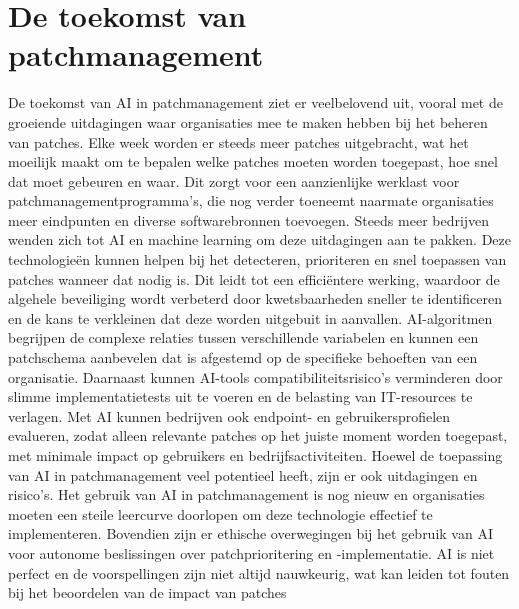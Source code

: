 \section{De toekomst van patchmanagement}
De toekomst van AI in patchmanagement ziet er veelbelovend uit, vooral met de groeiende uitdagingen waar organisaties mee te maken hebben bij
het beheren van patches. Elke week worden er steeds meer patches uitgebracht, wat het moeilijk maakt om te bepalen welke patches moeten worden toegepast, hoe snel dat moet gebeuren en waar. Dit zorgt voor een aanzienlijke werklast voor patchmanagementprogramma's, die nog verder toeneemt naarmate
organisaties meer eindpunten en diverse softwarebronnen toevoegen. Steeds meer bedrijven wenden zich tot AI en machine learning
om deze uitdagingen aan te pakken. Deze technologieën kunnen helpen bij het detecteren, prioriteren en snel toepassen van patches wanneer dat nodig is. Dit leidt tot een efficiëntere werking, waardoor de algehele beveiliging wordt verbeterd door kwetsbaarheden sneller te 
identificeren en de kans te verkleinen dat deze worden uitgebuit in aanvallen.
AI-algoritmen begrijpen de complexe relaties tussen verschillende variabelen en kunnen een patchschema aanbevelen dat is afgestemd op de specifieke behoeften van een organisatie. Daarnaast kunnen AI-tools compatibiliteitsrisico's 
verminderen door slimme implementatietests uit te voeren en de belasting van IT-resources te verlagen. Met AI kunnen bedrijven ook
 endpoint- en gebruikersprofielen evalueren, zodat alleen relevante patches op het juiste moment worden toegepast, met minimale impact op gebruikers en bedrijfsactiviteiten. Hoewel de toepassing van AI in patchmanagement veel potentieel heeft, zijn er 
 ook uitdagingen en risico's. Het gebruik van AI in patchmanagement is nog nieuw en organisaties moeten een steile leercurve doorlopen om deze technologie effectief te implementeren. Bovendien zijn er ethische 
overwegingen bij het gebruik van AI voor autonome beslissingen over patchprioritering en -implementatie. AI is niet perfect en de voorspellingen zijn niet altijd nauwkeurig, wat kan leiden tot fouten bij het beoordelen van de impact van patches​ \autocite{OFlaherty2023}

